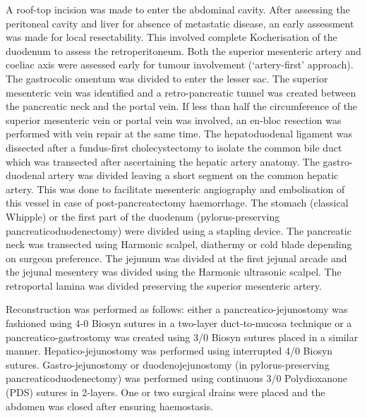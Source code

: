 A roof-top incision was made to enter the abdominal cavity. 
After assessing the peritoneal cavity and liver for absence of metastatic disease, an early assessment was made for local resectability. 
This involved complete Kocherisation of the duodenum to assess the retroperitoneum. 
Both the superior mesenteric artery and coeliac axis were assessed early for tumour involvement (‘artery-first’ approach). 
The gastrocolic omentum was divided to enter the lesser sac. 
The superior mesenteric vein was identified and a retro-pancreatic tunnel was created between the pancreatic neck and the portal vein. 
If less than half the circumference of the superior mesenteric vein or portal vein was involved, an en-bloc resection was performed with vein repair at the same time. 
The hepatoduodenal ligament was dissected after a fundus-first cholecystectomy to isolate the common bile duct which was transected after ascertaining the hepatic artery anatomy. 
The gastro-duodenal artery was divided leaving a short segment on the common hepatic artery. 
This was done to facilitate mesenteric angiography and embolisation of this vessel in case of post-pancreatectomy haemorrhage. 
The stomach (classical Whipple) or the first part of the duodenum (pylorus-preserving pancreaticoduodenectomy) were divided using a stapling device. 
The pancreatic neck was transected using Harmonic scalpel, diathermy or cold blade depending on surgeon preference. 
The jejunum was divided at the first jejunal arcade and the jejunal mesentery was divided using the Harmonic ultrasonic scalpel. 
The retroportal lamina was divided preserving the superior mesenteric artery. 

Reconstruction was performed as follows: either a pancreatico-jejunostomy was fashioned using 4-0 Biosyn sutures in a two-layer duct-to-mucosa technique or a pancreatico-gastrostomy was created using 3/0 Biosyn sutures placed in a similar manner. 
Hepatico-jejunostomy was performed using interrupted 4/0 Biosyn sutures.
Gastro-jejunostomy or duodenojejunostomy (in pylorus-preserving pancreaticoduodenectomy) was performed using continuous 3/0 Polydioxanone (PDS) sutures in 2-layers. 
One or two surgical drains were placed and the abdomen was closed after ensuring haemostasis.

